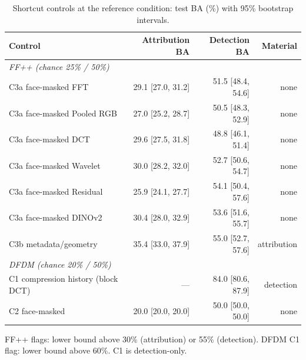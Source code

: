 \begin{table}[t]
\centering
\footnotesize
\caption{Shortcut controls at the reference condition: test BA (\%) with 95\% bootstrap intervals.}
\label{tab:controls}
\setlength{\tabcolsep}{3.5pt}
\begin{tabular}{lrrr}
\toprule
Control & Attribution BA & Detection BA & Material \\
\midrule
\multicolumn{4}{l}{\textit{FF++ (chance 25\% / 50\%)}} \\
C3a face-masked FFT & 29.1 [27.0, 31.2] & 51.5 [48.4, 54.6] & none \\
C3a face-masked Pooled RGB & 27.0 [25.2, 28.7] & 50.5 [48.3, 52.9] & none \\
C3a face-masked DCT & 29.6 [27.5, 31.8] & 48.8 [46.1, 51.4] & none \\
C3a face-masked Wavelet & 30.0 [28.2, 32.0] & 52.7 [50.6, 54.7] & none \\
C3a face-masked Residual & 25.9 [24.1, 27.7] & 54.1 [50.4, 57.6] & none \\
C3a face-masked DINOv2 & 30.4 [28.0, 32.9] & 53.6 [51.6, 55.7] & none \\
C3b metadata/geometry & 35.4 [33.0, 37.9] & 55.0 [52.7, 57.6] & attribution \\
\midrule
\multicolumn{4}{l}{\textit{DFDM (chance 20\% / 50\%)}} \\
C1 compression history (block DCT) & — & 84.0 [80.6, 87.9] & detection \\
C2 face-masked & 20.0 [20.0, 20.0] & 50.0 [50.0, 50.0] & none \\
\bottomrule
\end{tabular}
\par\smallskip\parbox{\linewidth}{\scriptsize FF++ flags: lower bound above 30\% (attribution) or 55\% (detection). DFDM C1 flag: lower bound above 60\%. C1 is detection-only.}
\end{table}
